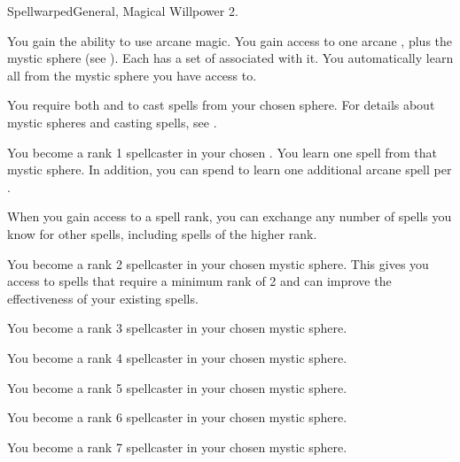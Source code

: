   \begin{magicalfeat}{Spellwarped}{General, Magical}
    \featpre Willpower 2.

     You gain the ability to use arcane magic.
    You gain access to one arcane , plus the  mystic sphere (see ).
    Each  has a set of  associated with it.
    You automatically learn all  from the mystic sphere you have access to.

    You require both  and  to cast spells from your chosen sphere.
    For details about mystic spheres and casting spells, see .

     You become a rank 1 spellcaster in your chosen .
    You learn one spell from that mystic sphere.
    In addition, you can spend  to learn one additional arcane spell per .

    When you gain access to a spell rank,
    you can exchange any number of spells you know for other spells,
    including spells of the higher rank.

     You become a rank 2 spellcaster in your chosen mystic sphere.
    This gives you access to spells that require a minimum rank of 2 and can improve the effectiveness of your existing spells.

     You become a rank 3 spellcaster in your chosen mystic sphere.

     You become a rank 4 spellcaster in your chosen mystic sphere.

     You become a rank 5 spellcaster in your chosen mystic sphere.

     You become a rank 6 spellcaster in your chosen mystic sphere.

     You become a rank 7 spellcaster in your chosen mystic sphere.
  \end{magicalfeat}

